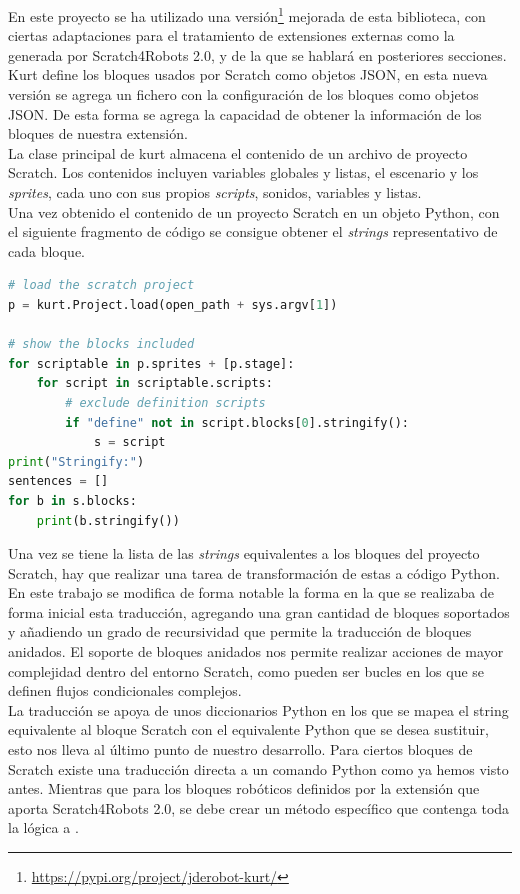 En este proyecto se ha utilizado una versión\footnote{\url{https://pypi.org/project/jderobot-kurt/}} mejorada de esta biblioteca, con ciertas adaptaciones para el tratamiento de extensiones externas como la generada por Scratch4Robots 2.0, y de la que se hablará en posteriores secciones. Kurt define los bloques usados por Scratch como objetos JSON, en esta nueva versión se agrega un fichero con la configuración de los bloques como objetos JSON. De esta forma se agrega la capacidad de obtener la información de los bloques de nuestra extensión.\\

La clase principal de kurt almacena el contenido de un archivo de proyecto Scratch. Los contenidos incluyen variables globales y listas, el escenario y los \textit{sprites}, cada uno con sus propios \textit{scripts}, sonidos, variables y listas.\\

Una vez obtenido el contenido de un proyecto Scratch en un objeto Python, con el siguiente fragmento de código se consigue obtener el \textit{strings} representativo de cada bloque.\\

\begin{lstlisting}[language=python,firstnumber=1]
# load the scratch project
p = kurt.Project.load(open_path + sys.argv[1])

# show the blocks included
for scriptable in p.sprites + [p.stage]:
	for script in scriptable.scripts:
		# exclude definition scripts
		if "define" not in script.blocks[0].stringify():
			s = script
print("Stringify:")
sentences = []
for b in s.blocks:
	print(b.stringify())
\end{lstlisting}

Una vez se tiene la lista de las \textit{strings} equivalentes a los bloques del proyecto Scratch, hay que realizar una tarea de transformación de estas a código Python.\\

En este trabajo se modifica de forma notable la forma en la que se realizaba de forma inicial esta traducción, agregando una gran cantidad de bloques soportados y añadiendo un grado de recursividad que permite la traducción de bloques anidados. El soporte de bloques anidados nos permite realizar acciones de mayor complejidad dentro del entorno Scratch, como pueden ser bucles en los que se definen flujos condicionales complejos.\\

La traducción se apoya de unos diccionarios Python en los que se mapea el string equivalente al bloque Scratch con el equivalente Python que se desea sustituir, esto nos lleva al último punto de nuestro desarrollo. Para ciertos bloques de Scratch existe una traducción directa a un comando Python como ya hemos visto antes. Mientras que para los bloques robóticos definidos por la extensión que aporta Scratch4Robots 2.0, se debe crear un método específico que contenga toda la lógica a .\\

